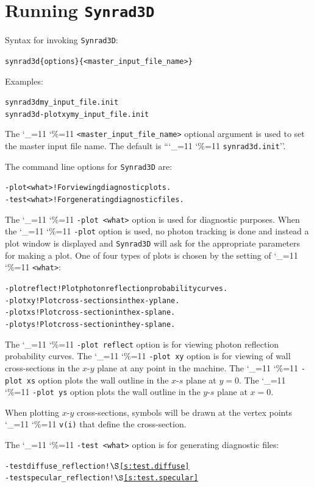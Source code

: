 \documentclass[11pt,openany]{report}
\newcommand{\sref}[1]{$\S$\ref{#1}}
\newcommand{\srthree}{\texttt{Synrad3D}\xspace}
\newcommand\ttcmd{\begingroup\catcode`\_=11 \catcode`\%=11 \dottcmd}
\newcommand\dottcmd[1]{\texttt{#1}\endgroup}
\newcommand{\vn}{\ttcmd}
\newlength{\ExBeg}
\newlength{\ExEnd}
\newenvironment{example}
  {\vspace{\ExBeg} \begin{alltt}}
  {\end{alltt} \vspace{\ExEnd}}
\begin{document}
\chapter{Running \srthree} 
\label{s:run}

Syntax for invoking \srthree:
\begin{example}
  synrad3d \{options\} \{<master_input_file_name>\}
\end{example}
Examples:
\begin{example}
  synrad3d my_input_file.init
  synrad3d -plot xy  my_input_file.init
\end{example}

The \vn{<master_input_file_name>} optional argument is used to set the
master input file name. The default is ``\vn{synrad3d.init}''. 

The command line options for \srthree are:
\begin{example}
  -plot <what>  ! For viewing diagnostic plots.
  -test <what>  ! For generating diagnostic files.
\end{example}

The \vn{-plot <what>} option is used for diagnostic purposes. When the
\vn{-plot} option is used, no photon tracking is done and instead a
plot window is displayed and \srthree will ask for the appropriate
parameters for making a plot. One of four types of plots is chosen by
the setting of \vn{<what>}:
\begin{example}
  -plot reflect ! Plot photon reflection probability curves.
  -plot xy      ! Plot cross-sections in the x-y plane.
  -plot xs      ! Plot cross-section in the x-s plane.
  -plot ys      ! Plot cross-section in the y-s plane.
\end{example}

The \vn{-plot reflect} option is for viewing photon reflection
probability curves. The \vn{-plot xy} option is for viewing of wall
cross-sections in the $x$-$y$ plane at any point in the machine. The
\vn{-plot xs} option plots the wall outline in the $x$-$s$ plane at $y
= 0$. The \vn{-plot ys} option plots the wall outline in the $y$-$s$
plane at $x = 0$.

When plotting $x$-$y$ cross-sections, symbols
will be drawn at the vertex points \vn{v(i)} that define the
cross-section.

The \vn{-test <what>} option is for generating diagnostic
files:
\begin{example}
  -test diffuse_reflection     ! \sref{s:test.diffuse}
  -test specular_reflection    ! \sref{s:test.specular}
\end{example}
\end{document}
